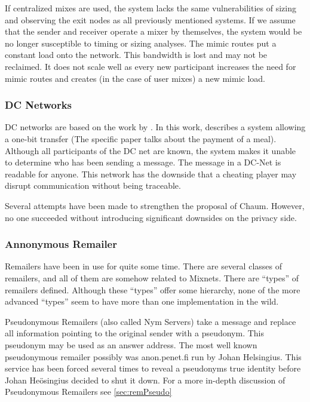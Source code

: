 If centralized mixes are used, the system lacks the same vulnerabilities of sizing and observing the exit nodes as all previously mentioned systems. If we assume that the sender and receiver operate a mixer by themselves, the system would be no longer susceptible to timing or sizing analyses. The mimic routes put a constant load onto the network. This bandwidth is lost and may not be reclaimed. It does not scale well as every new participant increases the need for mimic routes and creates (in the case of user mixes) a new mimic load.

\subsubsection{DC Networks}
DC networks are based on the work  by \citeauthor{chaum-dc}\cite{chaum-dc}. In this work, \citeauthor{chaum-dc} describes a system allowing a one-bit transfer (The specific paper talks about the payment of a meal). Although all participants of the DC net are known, the system makes it unable to determine who has been sending a message. The message in a DC-Net is readable for anyone. This network has the downside that a cheating player may disrupt communication without being traceable.

Several attempts have been made to strengthen the proposal of Chaum\cite{golle:eurocrypt2004}\cite{disco}. However, no one succeeded without introducing significant downsides on the privacy side.
\subsubsection{Annonymous Remailer\label{sec:remailer}}
Remailers have been in use for quite some time. There are several classes of remailers, and all of them are somehow related to Mixnets. There are ``types'' of remailers defined. Although these ``types'' offer some hierarchy, none of the more advanced ``types'' seem to have more than one implementation in the wild. 

Pseudonymous Remailers (also called Nym Servers) take a message and replace all information pointing to the original sender with a pseudonym. This pseudonym may be used as an answer address. The most well known pseudonymous remailer possibly was anon.penet.fi run by Johan Helsingius. This service has been forced several times to reveal a pseudonyms true identity before Johan Heösingius decided to shut it down. For a more in-depth discussion of Pseudonymous Remailers see \ref{sec:remPseudo}

